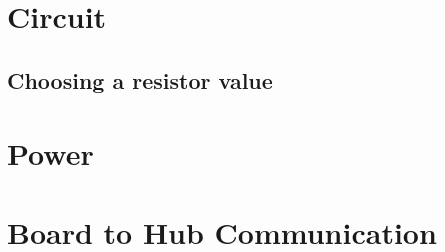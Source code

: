 \section{Circuit}


\subsection{Choosing a resistor value}




\section{Power}
    

\section{Board to Hub Communication}

    
    
    
    
    